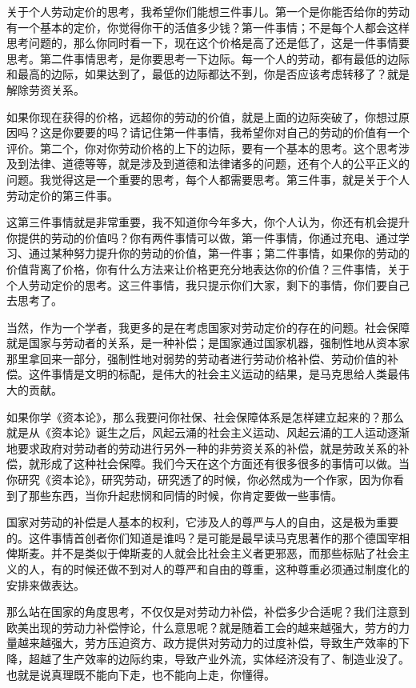 \documentclass[UTF8, 12pt, a4paper]{ctexrep}
\begin{document}
关于个人劳动定价的思考，我希望你们能想三件事儿。第一个是你能否给你的劳动有一个基本的定价，你觉得你干的活值多少钱？第一件事情；不是每个人都会这样思考问题的，那么你同时看一下，现在这个价格是高了还是低了，这是一件事情要思考。第二件事情思考，是你要思考一下边际。每一个人的劳动，都有最低的边际和最高的边际，如果达到了，最低的边际都达不到，你是否应该考虑转移了？就是解除劳资关系。

如果你现在获得的价格，远超你的劳动的价值，就是上面的边际突破了，你想过原因吗？这是你要要的吗？请记住第一件事情，我希望你对自己的劳动的价值有一个评价。第二个，你对你劳动价格的上下的边际，要有一个基本的思考。这个思考涉及到法律、道德等等，就是涉及到道德和法律诸多的问题，还有个人的公平正义的问题。我觉得这是一个重要的思考，每个人都需要思考。第三件事，就是关于个人劳动定价的第三件事。

这第三件事情就是非常重要，我不知道你今年多大，你个人认为，你还有机会提升你提供的劳动的价值吗？你有两件事情可以做，第一件事情，你通过充电、通过学习、通过某种努力提升你的劳动的价值，第一件事；第二件事情，如果你的劳动的价值背离了价格，你有什么方法来让价格更充分地表达你的价值？三件事情，关于个人劳动定价的思考。这三件事情，我只提示你们大家，剩下的事情，你们要自己去思考了。

当然，作为一个学者，我更多的是在考虑国家对劳动定价的存在的问题。社会保障就是国家与劳动者的关系，是一种补偿；是国家通过国家机器，强制性地从资本家那里拿回来一部分，强制性地对弱势的劳动者进行劳动价格补偿、劳动价值的补偿。这件事情是文明的标配，是伟大的社会主义运动的结果，是马克思给人类最伟大的贡献。

如果你学《资本论》，那么我要问你社保、社会保障体系是怎样建立起来的？那么就是从《资本论》诞生之后，风起云涌的社会主义运动、风起云涌的工人运动逐渐地要求政府对劳动者的劳动进行另外一种的非劳资关系的补偿，就是劳政关系的补偿，就形成了这种社会保障。我们今天在这个方面还有很多很多的事情可以做。当你研究《资本论》，研究劳动，研究透了的时候，你必然成为一个作家，因为你看到了那些东西，当你升起悲悯和同情的时候，你肯定要做一些事情。

国家对劳动的补偿是人基本的权利，它涉及人的尊严与人的自由，这是极为重要的。这件事情首创者你们知道是谁吗？是可能是最早读马克思著作的那个德国宰相俾斯麦。并不是类似于俾斯麦的人就会比社会主义者更邪恶，而那些标贴了社会主义的人，有的时候还做不到对人的尊严和自由的尊重，这种尊重必须通过制度化的安排来做表达。

那么站在国家的角度思考，不仅仅是对劳动力补偿，补偿多少合适呢？我们注意到欧美出现的劳动力补偿悖论，什么意思呢？就是随着工会的越来越强大，劳方的力量越来越强大，劳方压迫资方、政方提供对劳动力的过度补偿，导致生产效率的下降，超越了生产效率的边际约束，导致产业外流，实体经济没有了、制造业没了。也就是说真理既不能向下走，也不能向上走，你懂得。
\end{document}
